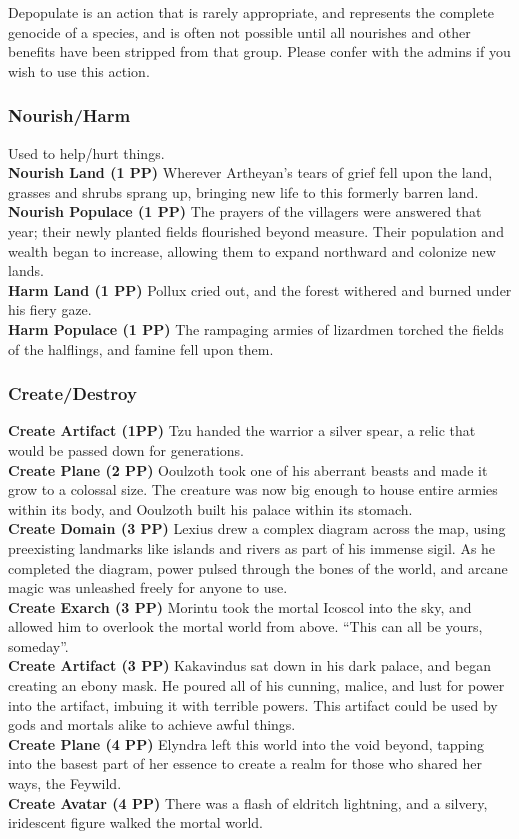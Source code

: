 \documentclass[10pt,a4paper]{article}
\begin{document}
Depopulate is an action that is rarely appropriate, and represents the complete genocide of a species, and is often not possible until all nourishes and other benefits have been stripped from that group.  Please confer with the admins if you wish to use this action. 


\subsubsection*{Nourish/Harm}
Used to help/hurt things.  \\
\textbf{Nourish Land (1 PP)} Wherever Artheyan's tears of grief fell upon the land, grasses and shrubs sprang up, bringing new life to this formerly barren land.\\
\textbf{Nourish Populace (1 PP)} The prayers of the villagers were answered that year; their newly planted fields flourished beyond measure. Their population and wealth began to increase, allowing them to expand northward and colonize new lands.\\
\textbf{Harm Land (1 PP)}  Pollux cried out, and the forest withered and burned under his fiery gaze.\\
\textbf{Harm Populace (1 PP)}  The rampaging armies of lizardmen torched the fields of the halflings, and famine fell upon them.

\subsubsection*{Create/Destroy}
\textbf{Create Artifact (1PP)} Tzu handed the warrior a silver spear, a relic that would be passed down for generations.\\
\textbf{Create Plane (2 PP)} Ooulzoth took one of his aberrant beasts and made it grow to a colossal size. The creature was now big enough to house entire armies within its body, and Ooulzoth built his palace within its stomach.\\
\textbf{Create Domain (3 PP)} Lexius drew a complex diagram across the map, using preexisting landmarks like islands and rivers as part of his immense sigil. As he completed the diagram, power pulsed through the bones of the world, and arcane magic was unleashed freely for anyone to use.\\
\textbf{Create Exarch (3 PP)} Morintu took the mortal Icoscol into the sky, and allowed him to overlook the mortal world from above. ``This can all be yours, someday''.\\
\textbf{Create Artifact (3 PP)} Kakavindus sat down in his dark palace, and began creating an ebony mask. He poured all of his cunning, malice, and lust for power into the artifact, imbuing it with terrible powers. This artifact could be used by gods and mortals alike to achieve awful things.\\
\textbf{Create Plane (4 PP)} Elyndra left this world into the void beyond, tapping into the basest part of her essence to create a realm for those who shared her ways, the Feywild.\\
\textbf{Create Avatar (4 PP)} There was a flash of eldritch lightning, and a silvery, iridescent figure walked the mortal world.
\end{document}
